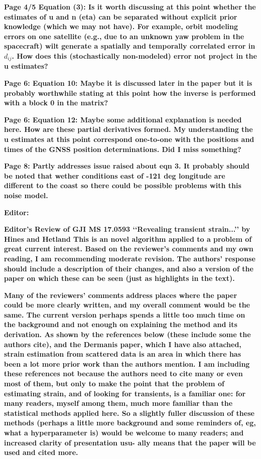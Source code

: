 \documentclass[10pt,a4paper]{letter}
\begin{document}
\begin{letter}{}
\textbf{Page 4/5 Equation (3): Is it worth discussing at this point whether
the estimates of u and n (eta) can be separated without explicit prior
knowledge (which we may not have).  For example, orbit modeling errors
on one satellite (e.g., due to an unknown yaw problem in the
spacecraft) wilt generate a spatially and temporally correlated error
in $d_{ij}$.  How does this (stochastically non-modeled) error not project
in the u estimates?}

\textbf{Page 6: Equation 10: Maybe it is discussed later in the paper but it
is probably worthwhile stating at this point how the inverse is
performed with a block 0 in the matrix?}

\textbf{Page 6: Equation 12: Maybe some additional explanation is needed here.
How are these partial derivatives formed.  My understanding the u
estimates at this point correspond one-to-one with the positions and
times of the GNSS position determinations.  Did I miss something?}

\textbf{Page 8: Partly addresses issue raised about eqn 3.  It probably should
be noted that wether conditions east of -121 deg longitude are
different to the coast so there could be possible problems with this
noise model.}


\textbf{Editor:}\newline

\textbf{Editor’s Review of GJI MS 17.0593 ‘‘Revealing transient strain...’’ by
Hines and Hetland This is an novel algorithm applied to a problem of
great current interest. Based on the reviewer’s comments and my own
reading, I am recommending moderate revision. The authors’ response
should include a description of their changes, and also a version of
the paper on which these can be seen (just as highlights in the text).}

\textbf{Many of the reviewers’ comments address places where the paper could
be more clearly written, and my overall comment would be the same. The
current version perhaps spends a little too much time on the
background and not enough on explaining the method and its derivation.
As shown by the references below (these include some the authors
cite), and the Dermanis paper, which I have also attached, strain
estimation from scattered data is an area in which there has been a
lot more prior work than the authors mention. I am including these
references not because the authors need to cite many or even most of
them, but only to make the point that the problem of estimating
strain, and of looking for transients, is a familiar one: for many
readers, myself among them, much more familiar than the statistical
methods applied here. So a slightly fuller discussion of these methods
(perhaps a little more background and some reminders of, eg, what a
hyperparameter is) would be welcome to many readers; and increased
clarity of presentation usu- ally means that the paper will be used
and cited more.}


\end{letter}
\end{document}
